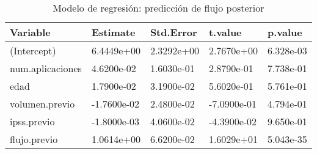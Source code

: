 \begin{table}[ht]
\centering
\caption{Modelo de regresión: predicción de flujo posterior} 
\label{tab:modelo_flujo}
\begin{tabular}{lllll}
  \hline
Variable & Estimate & Std.Error & t.value & p.value \\ 
  \hline
(Intercept) &  6.4449e+00 & 2.3292e+00 &  2.7670e+00 & 6.328e-03 \\ 
  num.aplicaciones &  4.6200e-02 & 1.6030e-01 &  2.8790e-01 & 7.738e-01 \\ 
  edad &  1.7900e-02 & 3.1900e-02 &  5.6020e-01 & 5.761e-01 \\ 
  volumen.previo & -1.7600e-02 & 2.4800e-02 & -7.0900e-01 & 4.794e-01 \\ 
  ipss.previo & -1.8000e-03 & 4.0600e-02 & -4.3900e-02 & 9.650e-01 \\ 
  flujo.previo &  1.0614e+00 & 6.6200e-02 &  1.6029e+01 & 5.043e-35 \\ 
   \hline
\end{tabular}
\end{table}
